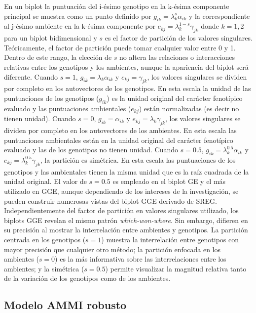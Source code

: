 En un biplot la puntuación del i-ésimo genotipo en la k-ésima componente principal se muestra como un punto definido por $g_{ik} = \lambda_k^{s} \alpha_{ik}$ y la correspondiente al j-ésimo ambiente en la k-ésima componente por $e_{kj} = \lambda_k^{1-s} \gamma_{jk}$ donde $k=1,2$ para un biplot bidimensional y $s$ es el factor de partición de los valores singulares. Teóricamente, el factor de partición puede tomar cualquier valor entre 0 y 1. Dentro de este rango, la elección de $s$ no altera las relaciones o interacciones relativas entre los genotipos y los ambientes, aunque la apariencia del biplot será diferente. Cuando $s=1$, 
$g_{ik} = \lambda_k \alpha_{ik}$ y $e_{kj} = \gamma_{jk}$, los valores singulares se dividen por completo en los autovectores de los genotipos. En esta escala la unidad de las puntuaciones de los genotipos ($g_{ik}$) es la unidad original del carácter fenotípico evaluado y las puntuaciones ambientales ($e_{kj}$) están normalizadas (es decir no tienen unidad). Cuando $s=0$, $g_{ik} = \alpha_{ik}$ y $e_{kj} = \lambda_k \gamma_{jk}$, los valores singulares se dividen por completo en los autovectores de los ambientes. En esta escala las puntuaciones ambientales están en la unidad original del carácter fenotípico evaluado y las de los genotipos no tienen unidad. Cuando $s=0.5$, $g_{ik} = \lambda_k^{0.5} \alpha_{ik}$ y $e_{kj} = \lambda_k^{0.5} \gamma_{jk}$, la partición es simétrica. En esta escala las puntuaciones de los genotipos y las ambientales tienen la misma unidad que es la raíz cuadrada de la unidad original. El valor de $s=0.5$ es empleado en el biplot GE y el más utilizado en GGE, aunque dependiendo de los intereses de la investigación, se pueden construir numerosas vistas del biplot GGE derivado de SREG. Independientemente del factor de partición en valores singulares utilizado, los biplots GGE revelan el mismo patrón \emph{which-won-where}. Sin embargo, difieren en su precisión al mostrar la interrelación entre ambientes y genotipos. La partición centrada en los genotipos ($s=1$) muestra la interrelación entre genotipos con mayor precisión que cualquier otro método; la partición enfocada en los ambientes ($s=0$) es la más informativa sobre las interrelaciones entre los ambientes; y la simétrica ($s=0.5$) permite visualizar la magnitud relativa tanto de la variación de los genotipos como de los ambientes. 


\subsection{Modelo AMMI robusto}

